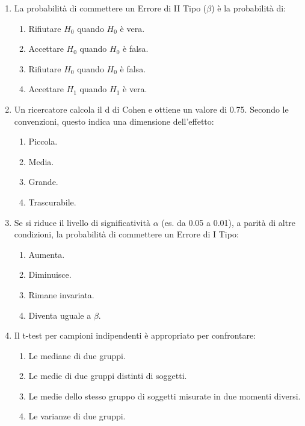 \documentclass[12pt, a4paper]{article}
\begin{document}
\begin{enumerate}[resume]
    \item La probabilità di commettere un Errore di II Tipo ($\beta$) è la probabilità di:
    \begin{enumerate}
        \item Rifiutare $H_0$ quando $H_0$ è vera.
        \item Accettare $H_0$ quando $H_0$ è falsa.
        \item Rifiutare $H_0$ quando $H_0$ è falsa.
        \item Accettare $H_1$ quando $H_1$ è vera.
    \end{enumerate}
    \vspace{0.3cm}

    \item Un ricercatore calcola il d di Cohen e ottiene un valore di 0.75. Secondo le convenzioni, questo indica una dimensione dell'effetto:
    \begin{enumerate}
        \item Piccola.
        \item Media.
        \item Grande.
        \item Trascurabile.
    \end{enumerate}
    \vspace{0.3cm}

    \item Se si riduce il livello di significatività $\alpha$ (es. da 0.05 a 0.01), a parità di altre condizioni, la probabilità di commettere un Errore di I Tipo:
    \begin{enumerate}
        \item Aumenta.
        \item Diminuisce.
        \item Rimane invariata.
        \item Diventa uguale a $\beta$.
    \end{enumerate}
    \vspace{0.3cm}

    \item Il t-test per campioni indipendenti è appropriato per confrontare:
    \begin{enumerate}
        \item Le mediane di due gruppi.
        \item Le medie di due gruppi distinti di soggetti.
        \item Le medie dello stesso gruppo di soggetti misurate in due momenti diversi.
        \item Le varianze di due gruppi.
    \end{enumerate}
    \vspace{0.3cm}


\end{enumerate}
\end{document}
